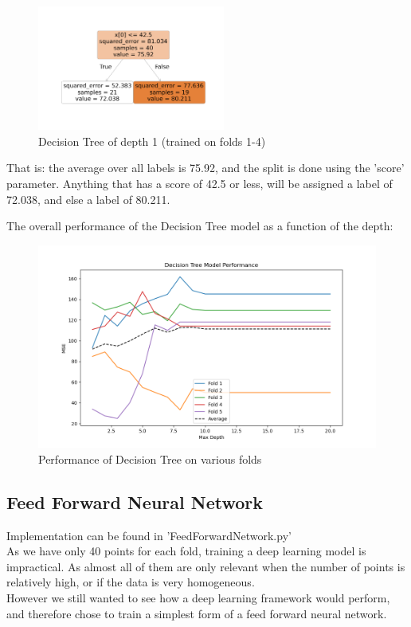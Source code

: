 \documentclass[11pt, oneside]{article}   	%
\begin{document}
\begin{figure}[H]
    \begin{center}
    \includegraphics[width=0.55\textwidth]{../plots/decision_tree}
    \caption{Decision Tree of depth 1 (trained on folds 1-4)}
    \end{center}
\end{figure}
 
That is: the average over all labels is 75.92, and the split is done using the 'score' parameter. Anything that has a score of 42.5 or less, will be assigned a label of 72.038, and else a label of 80.211.

The overall performance of the Decision Tree model as a function of the depth:
\begin{figure}[H]
    \begin{center}
        \includegraphics[width=0.65\linewidth]{../plots/decision_tree_performance}
        \caption{Performance of Decision Tree on various folds}
    \end{center}
\end{figure}

\subsection{Feed Forward Neural Network}\label{sec:ffn}
Implementation can be found in 'FeedForwardNetwork.py'\\

As we have only 40 points for each fold, training a deep learning model is impractical. As almost all of them are only relevant when the number of points is relatively high, or if the data is very homogeneous.\\
However we still wanted to see how a deep learning framework would perform, and therefore chose to train a simplest form of a feed forward neural network.
\end{document}
